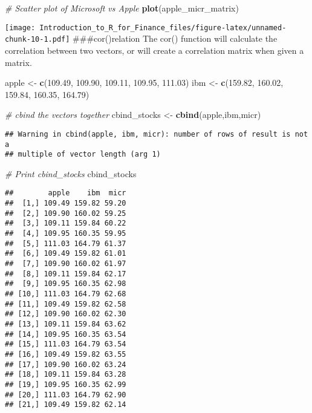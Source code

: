 \documentclass[]{article}
\newenvironment{Shaded}{\begin{snugshade}}{\end{snugshade}}
\newcommand{\KeywordTok}[1]{\textcolor[rgb]{0.13,0.29,0.53}{\textbf{#1}}}
\newcommand{\FloatTok}[1]{\textcolor[rgb]{0.00,0.00,0.81}{#1}}
\newcommand{\StringTok}[1]{\textcolor[rgb]{0.31,0.60,0.02}{#1}}
\newcommand{\CommentTok}[1]{\textcolor[rgb]{0.56,0.35,0.01}{\textit{#1}}}
\newcommand{\NormalTok}[1]{#1}
\begin{document}
\begin{Shaded}
\begin{Highlighting}[]
\CommentTok{# Scatter plot of Microsoft vs Apple}
\KeywordTok{plot}\NormalTok{(apple_micr_matrix)}
\end{Highlighting}
\end{Shaded}

\texttt{[image: Introduction\_to\_R\_for\_Finance\_files/figure-latex/unnamed-chunk-10-1.pdf]}
\#\#\#cor()relation The cor() function will calculate the correlation
between two vectors, or will create a correlation matrix when given a
matrix.

\begin{Shaded}
\begin{Highlighting}[]
\NormalTok{apple <-}\StringTok{ }\KeywordTok{c}\NormalTok{(}\FloatTok{109.49}\NormalTok{, }\FloatTok{109.90}\NormalTok{, }\FloatTok{109.11}\NormalTok{, }\FloatTok{109.95}\NormalTok{, }\FloatTok{111.03}\NormalTok{)}
\NormalTok{ibm <-}\StringTok{ }\KeywordTok{c}\NormalTok{(}\FloatTok{159.82}\NormalTok{, }\FloatTok{160.02}\NormalTok{, }\FloatTok{159.84}\NormalTok{, }\FloatTok{160.35}\NormalTok{, }\FloatTok{164.79}\NormalTok{)}

\CommentTok{# cbind the vectors together}
\NormalTok{cbind_stocks <-}\StringTok{ }\KeywordTok{cbind}\NormalTok{(apple,ibm,micr)}
\end{Highlighting}
\end{Shaded}

\begin{verbatim}
## Warning in cbind(apple, ibm, micr): number of rows of result is not a
## multiple of vector length (arg 1)
\end{verbatim}

\begin{Shaded}
\begin{Highlighting}[]
\CommentTok{# Print cbind_stocks}
\NormalTok{cbind_stocks}
\end{Highlighting}
\end{Shaded}

\begin{verbatim}
##        apple    ibm  micr
##  [1,] 109.49 159.82 59.20
##  [2,] 109.90 160.02 59.25
##  [3,] 109.11 159.84 60.22
##  [4,] 109.95 160.35 59.95
##  [5,] 111.03 164.79 61.37
##  [6,] 109.49 159.82 61.01
##  [7,] 109.90 160.02 61.97
##  [8,] 109.11 159.84 62.17
##  [9,] 109.95 160.35 62.98
## [10,] 111.03 164.79 62.68
## [11,] 109.49 159.82 62.58
## [12,] 109.90 160.02 62.30
## [13,] 109.11 159.84 63.62
## [14,] 109.95 160.35 63.54
## [15,] 111.03 164.79 63.54
## [16,] 109.49 159.82 63.55
## [17,] 109.90 160.02 63.24
## [18,] 109.11 159.84 63.28
## [19,] 109.95 160.35 62.99
## [20,] 111.03 164.79 62.90
## [21,] 109.49 159.82 62.14
\end{verbatim}
\end{document}

